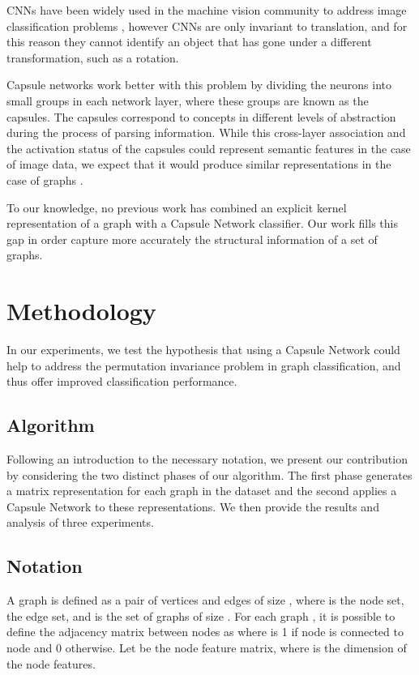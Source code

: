\documentclass[conference]{IEEEtran}
\begin{document}
CNNs have been widely used in the machine vision community to address image classification problems \cite{krizhevsky2012imagenet}, however CNNs are only invariant to translation, and for this reason they cannot identify an object that has gone under a different transformation, such as a rotation.

Capsule networks work better with this problem by dividing the neurons into small groups in each network layer, where these groups are known as the capsules. The capsules correspond to concepts in different levels of abstraction during the process of parsing information. While this cross-layer association and the activation status of the capsules could represent semantic features in the case of image data, we expect that it would produce similar representations in the case of graphs \cite{lin2018learning}. 

To our knowledge, no previous work has combined an explicit kernel representation of a graph with a Capsule Network classifier. Our work fills this gap in order capture more accurately the structural information of a set of graphs. 

\section{Methodology}

In our experiments, we test the hypothesis that using a Capsule Network could help to address the permutation invariance problem in graph classification, and thus offer improved classification performance.

\subsection{Algorithm}
Following an introduction to the necessary notation, we present our contribution by considering the two distinct phases of our algorithm. The first phase generates a matrix representation for each graph in the dataset and the second applies a Capsule Network to these representations. We then provide the results and analysis of three experiments.

\subsection{Notation}
A graph  is defined as a pair of vertices and edges  of size , where  is the node set,  the edge set, and  is the set of graphs of size .
For each graph , it is possible to define the adjacency matrix between nodes as  where  is 1 if node  is connected to node  and 0 otherwise. Let  be the node feature matrix, where  is the dimension of the node features.
\end{document}
